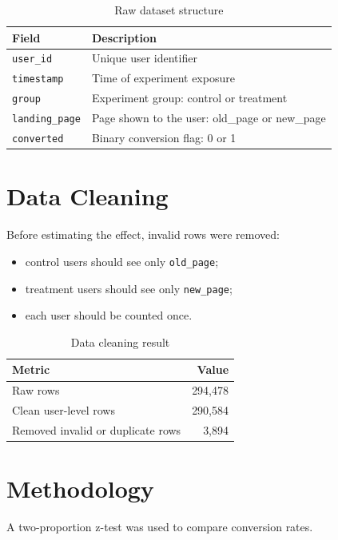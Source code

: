 \documentclass[11pt,a4paper]{article}
\begin{document}
\begin{table}[H]
\centering
\begin{tabular}{ll}
\toprule
\textbf{Field} & \textbf{Description} \\
\midrule
\texttt{user\_id} & Unique user identifier \\
\texttt{timestamp} & Time of experiment exposure \\
\texttt{group} & Experiment group: control or treatment \\
\texttt{landing\_page} & Page shown to the user: old\_page or new\_page \\
\texttt{converted} & Binary conversion flag: 0 or 1 \\
\bottomrule
\end{tabular}
\caption{Raw dataset structure}
\end{table}

\section{Data Cleaning}

Before estimating the effect, invalid rows were removed:

\begin{itemize}
    \item control users should see only \texttt{old\_page};
    \item treatment users should see only \texttt{new\_page};
    \item each user should be counted once.
\end{itemize}

\begin{table}[H]
\centering
\begin{tabular}{lr}
\toprule
\textbf{Metric} & \textbf{Value} \\
\midrule
Raw rows & 294,478 \\
Clean user-level rows & 290,584 \\
Removed invalid or duplicate rows & 3,894 \\
\bottomrule
\end{tabular}
\caption{Data cleaning result}
\end{table}

\section{Methodology}

A two-proportion z-test was used to compare conversion rates.
\end{document}
